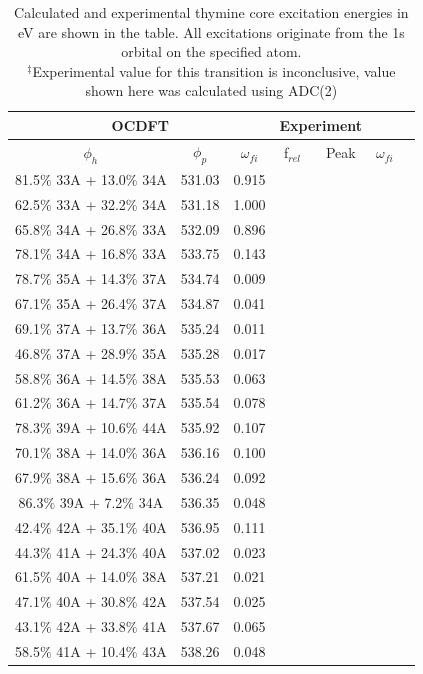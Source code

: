 \documentclass[12pt]{article}
\begin{document}
   \begin{table}
 \centering
     \begin{tabular}{c@{\hskip 0.22in}c@{\hskip 0.22in}c@{\hskip 0.22in}c@{\hskip 0.52in}c@{\hskip 0.22in}c@{\hskip 0.22in}c}
     \hline
     \hline
   \multicolumn{3}{c}{OCDFT} &\multicolumn{2}{c}{Experiment} \\
   \hline
 $\phi_h$ &  $\phi_p$ & $\omega_{fi}$ & f$_{rel}$ & Peak &  $\omega_{fi}$   \\
   \hline
   81.5$\%$ 33A  +   13.0$\%$ 34A  & 531.03 & 0.915 \\
   62.5$\%$ 33A  +   32.2$\%$ 34A  & 531.18 & 1.000 \\
   65.8$\%$ 34A  +   26.8$\%$ 33A  & 532.09 & 0.896 \\
   78.1$\%$ 34A  +   16.8$\%$ 33A  & 533.75 & 0.143 \\
   78.7$\%$ 35A  +   14.3$\%$ 37A  & 534.74 & 0.009 \\
   67.1$\%$ 35A  +   26.4$\%$ 37A  & 534.87 & 0.041 \\
   69.1$\%$ 37A  +   13.7$\%$ 36A  & 535.24 & 0.011 \\
   46.8$\%$ 37A  +   28.9$\%$ 35A  & 535.28 & 0.017 \\
   58.8$\%$ 36A  +   14.5$\%$ 38A  & 535.53 & 0.063 \\
   61.2$\%$ 36A  +   14.7$\%$ 37A  & 535.54 & 0.078 \\
   78.3$\%$ 39A  +   10.6$\%$ 44A  & 535.92 & 0.107 \\
   70.1$\%$ 38A  +   14.0$\%$ 36A  & 536.16 & 0.100 \\
   67.9$\%$ 38A  +   15.6$\%$ 36A  & 536.24 & 0.092 \\
   86.3$\%$ 39A  +   7.2$\%$ 34A  & 536.35 & 0.048 \\
   42.4$\%$ 42A  +   35.1$\%$ 40A  & 536.95 & 0.111 \\
   44.3$\%$ 41A  +   24.3$\%$ 40A  & 537.02 & 0.023 \\
   61.5$\%$ 40A  +   14.0$\%$ 38A  & 537.21 & 0.021 \\
   47.1$\%$ 40A  +   30.8$\%$ 42A  & 537.54 & 0.025 \\
   43.1$\%$ 42A  +   33.8$\%$ 41A  & 537.67 & 0.065 \\
   58.5$\%$ 41A  +   10.4$\%$ 43A  & 538.26 & 0.048 \\
    \end{tabular}
      \caption{Calculated and experimental thymine core excitation energies in eV are shown in the table. All excitations originate from the 1s orbital on the specified atom. \\
  $^{\ddagger}$Experimental value for this transition is inconclusive, value shown here was calculated using ADC(2)}
  \label{figure:MOs}
  \end{table}
\end{document}

